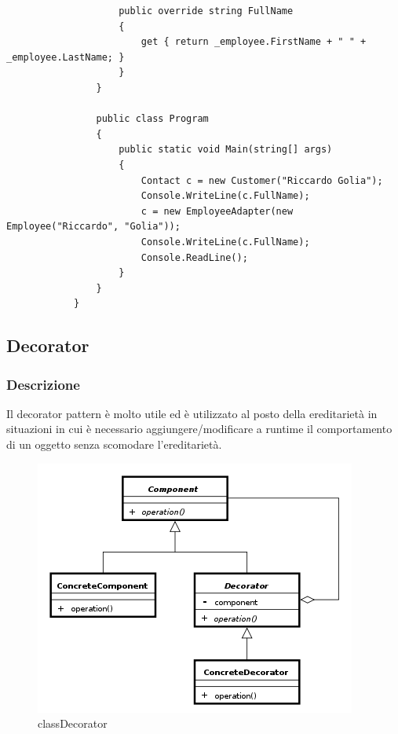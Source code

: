 \documentclass[a4paper,10pt]{article}
\begin{document}
\begin{lstlisting}
                    public override string FullName
                    {
                        get { return _employee.FirstName + " " + _employee.LastName; }
                    }
                }
            
                public class Program
                {
                    public static void Main(string[] args)
                    {
                        Contact c = new Customer("Riccardo Golia");
                        Console.WriteLine(c.FullName);
                        c = new EmployeeAdapter(new Employee("Riccardo", "Golia"));
                        Console.WriteLine(c.FullName);
                        Console.ReadLine();
                    }
                }
            }
        \end{lstlisting}

    \newpage

    \subsection{Decorator}
    \subsubsection{Descrizione}
    Il decorator pattern è molto utile ed è utilizzato al posto della ereditarietà in situazioni in cui è necessario aggiungere/modificare a runtime il comportamento di un oggetto senza scomodare l’ereditarietà.    
    \begin{figure}[h!] %
        \centering
        \includegraphics[scale=0.75]{img/decorator}	
        \caption{classDecorator}
    \end{figure}
\end{document}
